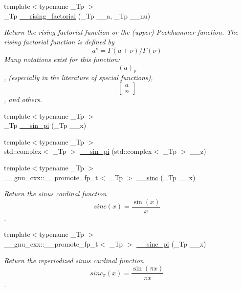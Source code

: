 \begin{DoxyCompactItemize}
{\footnotesize template$<$typename \+\_\+\+Tp $>$ }\\\+\_\+\+Tp \hyperlink{namespacestd_1_1____detail_a109a13aa776d60bdc49b1cedc0e77670}{\+\_\+\+\_\+rising\+\_\+factorial} (\+\_\+\+Tp \+\_\+\+\_\+a, \+\_\+\+Tp \+\_\+\+\_\+nu)
\begin{DoxyCompactList}\small\item\em Return the rising factorial function or the (upper) Pochhammer function. The rising factorial function is defined by \[ a^{\overline{\nu}} = \Gamma(a + \nu) / \Gamma(\nu) \] Many notations exist for this function\+: \[ (a)_\nu \], (especially in the literature of special functions), \[ \left[ \begin{array}{c} a \\ n \end{array} \right] \], and others. \end{DoxyCompactList}\item 
{\footnotesize template$<$typename \+\_\+\+Tp $>$ }\\\+\_\+\+Tp \hyperlink{namespacestd_1_1____detail_a763249defff6377195818c2fc6e7bca2}{\+\_\+\+\_\+sin\+\_\+pi} (\+\_\+\+Tp \+\_\+\+\_\+x)
\item 
{\footnotesize template$<$typename \+\_\+\+Tp $>$ }\\std\+::complex$<$ \+\_\+\+Tp $>$ \hyperlink{namespacestd_1_1____detail_a5f26e85b3d646e5c69be173baebd4185}{\+\_\+\+\_\+sin\+\_\+pi} (std\+::complex$<$ \+\_\+\+Tp $>$ \+\_\+\+\_\+z)
\item 
{\footnotesize template$<$typename \+\_\+\+Tp $>$ }\\\+\_\+\+\_\+gnu\+\_\+cxx\+::\+\_\+\+\_\+promote\+\_\+fp\+\_\+t$<$ \+\_\+\+Tp $>$ \hyperlink{namespacestd_1_1____detail_aa7bdd4dd998288441b84ca2e142a4a04}{\+\_\+\+\_\+sinc} (\+\_\+\+Tp \+\_\+\+\_\+x)
\begin{DoxyCompactList}\small\item\em Return the sinus cardinal function \[ sinc(x) = \frac{\sin(x)}{x} \]. \end{DoxyCompactList}\item 
{\footnotesize template$<$typename \+\_\+\+Tp $>$ }\\\+\_\+\+\_\+gnu\+\_\+cxx\+::\+\_\+\+\_\+promote\+\_\+fp\+\_\+t$<$ \+\_\+\+Tp $>$ \hyperlink{namespacestd_1_1____detail_accfe65ec3790f60b0b429afbd4000bb1}{\+\_\+\+\_\+sinc\+\_\+pi} (\+\_\+\+Tp \+\_\+\+\_\+x)
\begin{DoxyCompactList}\small\item\em Return the reperiodized sinus cardinal function \[ sinc_\pi(x) = \frac{\sin(\pi x)}{\pi x} \]. \end{DoxyCompactList}\item 

\end{DoxyCompactItemize}
